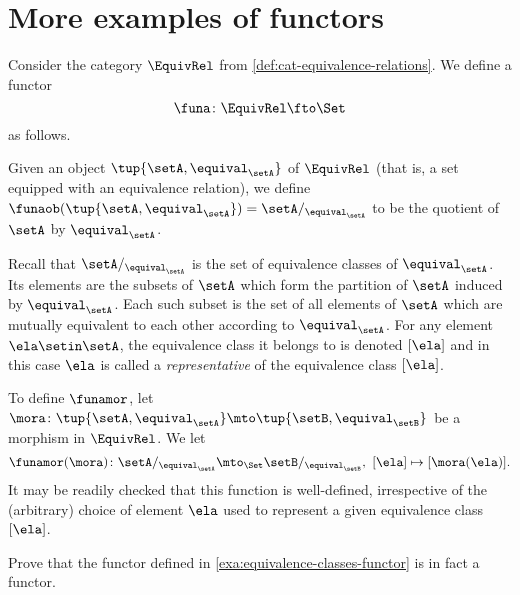 
\section{More examples of functors}
\label{sec:more-examples-functors}

\begin{example}
    \label{exa:equivalence-classes-functor}
    Consider the category $\EquivRel$ from \cref{def:cat-equivalence-relations}.
    We define a functor
    \begin{equation}
        \funa \colon \EquivRel \fto \Set
    \end{equation}
    as follows.

    Given an object $\tup{\setA, \equival_\setA}$ of $\EquivRel$ (that is, a set equipped with an equivalence relation), we define $\funaob(\tup{\setA, \equival_\setA}) = \setA/_{\equival_\setA}$ to be the quotient of $\setA$ by $\equival_\setA$.

    Recall that $\setA/_{\equival_\setA}$ is the set of equivalence classes of $\equival_\setA$.
    Its elements are the subsets of $\setA$ which form the partition of $\setA$ induced by $\equival_\setA$.
    Each such subset is the set of all elements of $\setA$ which are mutually equivalent to each other according to $\equival_\setA$.
    For any element $\ela \setin \setA$, the equivalence class it belongs to is denoted $[\ela]$ and in this case $\ela$ is called a \emph{representative} of the equivalence class $[\ela]$.

    To define $\funamor$, let $\mora \colon \tup{\setA, \equival_\setA} \mto \tup{\setB, \equival_\setB}$ be a morphism in $\EquivRel$.
    We let
    \begin{equation}
        \funamor(\mora) \colon \setA/_{\equival_\setA} \mto_\Set \setB/_{\equival_\setB}, \ [\ela] \mapsto [\mora(\ela)].
    \end{equation}
    It may be readily checked that this function is well-defined, irrespective of the (arbitrary) choice of element $\ela$ used to represent a given equivalence class $[\ela]$.
\end{example}


\begin{exercise}
    Prove that the functor defined in \cref{exa:equivalence-classes-functor} is in fact a functor.
\end{exercise}
\begin{solution}
\end{solution}

